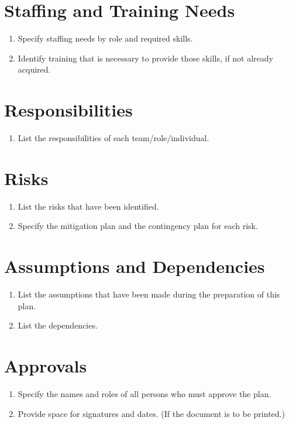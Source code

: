 \section{Staffing and Training Needs}

\begin{enumerate}
	\item Specify staffing needs by role and required skills.
	\item Identify training that is necessary to provide those skills, if not already acquired.
\end{enumerate}

\section{Responsibilities}

\begin{enumerate}
	\item List the responsibilities of each team/role/individual.
\end{enumerate}

\section{Risks}

\begin{enumerate}
	\item List the risks that have been identified.
	\item Specify the mitigation plan and the contingency plan for each risk.
\end{enumerate}

\section{Assumptions and Dependencies}

\begin{enumerate}
	\item List the assumptions that have been made during the preparation of this plan.
	\item List the dependencies.
\end{enumerate}
\section{Approvals}
\begin{enumerate}
	\item Specify the names and roles of all persons who must approve the plan.
	\item Provide space for signatures and dates. (If the document is to be printed.)
\end{enumerate}
